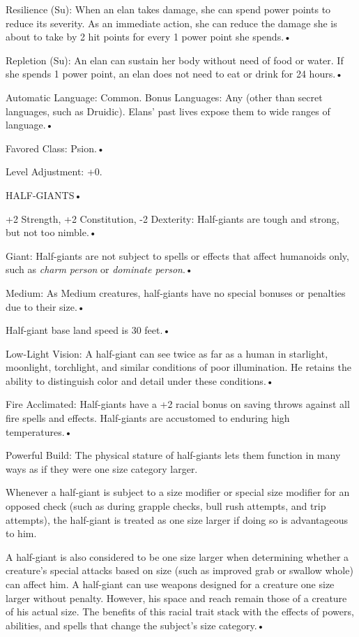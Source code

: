\documentclass{article}
\begin{document}
\parindent=3pt
Resilience (Su): When an elan takes damage, she can spend power points to reduce 
its severity. As an immediate action, she can reduce the damage she is about to 
take by 2 hit points for every 1 power point she spends.• 

Repletion (Su): An elan can sustain her body without need of food or water. If 
she spends 1 power point, an elan does not need to eat or drink for 24 hours.• 

\parindent=7pt
Automatic Language: Common. Bonus Languages: Any (other than secret languages, 
such as Druidic). Elans' past lives expose them to wide ranges of language.• 

\parindent=3pt
Favored Class: Psion.• 

Level Adjustment: +0.

\vspace{12pt}
\parindent=0pt
{\LARGE{}HALF-GIANTS• }

\parindent=3pt
+2 Strength, +2 Constitution, -2 Dexterity: Half-giants are tough and strong, but 
not too nimble.• 

Giant: Half-giants are not subject to spells or effects that affect humanoids only, 
such as \textit{charm person }or \textit{dominate person}.• 

Medium: As Medium creatures, half-giants have no special bonuses or penalties due 
to their size.• 

\parindent=7pt
Half-giant base land speed is 30 feet.• 

\parindent=3pt
Low-Light Vision: A half-giant can see twice as far as a human in starlight, moonlight, 
torchlight, and similar conditions of poor illumination. He retains the ability 
to distinguish color and detail under these conditions.• 

Fire Acclimated: Half-giants have a +2 racial bonus on saving throws against all 
fire spells and effects. Half-giants are accustomed to enduring high temperatures.• 

\parindent=7pt
Powerful Build: The physical stature of half-giants lets them function in many 
ways as if they were one size category larger.

\parindent=0pt
Whenever a half-giant is subject to a size modifier or special size modifier for 
an opposed check (such as during grapple checks, bull rush attempts, and trip attempts), 
the half-giant is treated as one size larger if doing so is advantageous to him.

A half-giant is also considered to be one size larger when determining whether 
a creature's special attacks based on size (such as improved grab or swallow whole) 
can affect him. A half-giant can use weapons designed for a creature one size larger 
without penalty. However, his space and reach remain those of a creature of his 
actual size. The benefits of this racial trait stack with the effects of powers, 
abilities, and spells that change the subject's size category.• 
\end{document}
